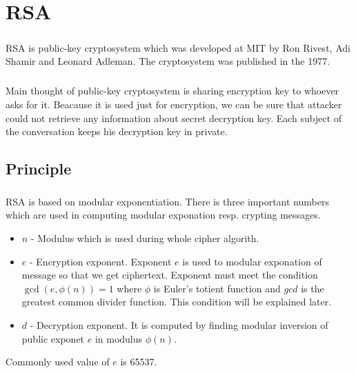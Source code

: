 \documentclass[thesis=B,english]{FITthesis}[2012/10/20]
\begin{document}
{\paragraph*{}{
}
\paragraph*{}{
}


\chapter{RSA}

\paragraph*{}
{RSA is public-key cryptosystem which was developed at MIT by Ron Rivest, Adi Shamir and Leonard Adleman. The cryptosystem was published in the 1977.
}

\paragraph*{}{
Main thought of public-key cryptosystem is sharing encryption key to whoever asks for it. Beacause it is used just for encryption, we can be sure that attacker could not retrieve any information about secret decryption key. Each subject of the conversation keeps his decryption key in private.
}



\section{Principle}
\paragraph*{}
{RSA is based on modular exponentiation. There is three important numbers which are used in computing modular exponation resp. crypting messages.}
\begin{itemize}
 \item \(n\) - Modulus which is used during whole cipher algorith.
 \item \(e\) - Encryption exponent. Exponent \(e\) is used to modular exponation of message so that we get ciphertext. Exponent must meet the condition  \(\gcd(e,\phi(n)) = 1\) where \(\phi\) is Euler's totient function and \(gcd\) is the greatest common divider function. This condition will be explained later.
 \item \(d\) - Decryption exponent. It is computed by finding modular inversion of public exponet \(e\) in modulus \(\phi(n)\).
\end{itemize}
{Commonly used value of \(e\) is 65537.}
}
\end{document}
